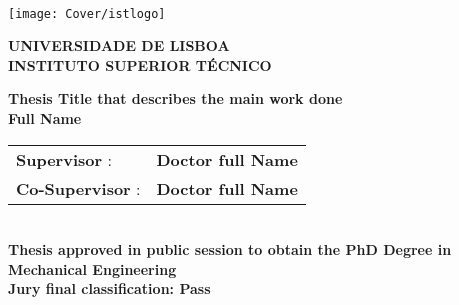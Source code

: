 \setcounter{page}{1} 


\thispagestyle{empty}
\begin{flushleft} ~\\ \vspace{-12mm} \hspace{-12mm}  \texttt{[image: Cover/istlogo]} 
 
\centering
\LARGE \textbf{UNIVERSIDADE DE LISBOA \\ INSTITUTO SUPERIOR TÉCNICO}
\vspace{10mm}

 
\centering
\Large \textbf{Thesis Title that describes the main work done}
\\ \vspace{8mm}  %
\Large\textbf{Full Name} \\
\vspace{8mm}

\Large %
\begin{minipage}{\textwidth}
\begin{tabularx}{\textwidth}{ l @{ } l }
 \textbf{Supervisor} : & \textbf{Doctor full Name}\\
 \textbf{Co-Supervisor} :  &  \textbf{Doctor full Name}\\
\end{tabularx}
\end{minipage}
\\ \vspace{8mm}
\centering
\Large \textbf{Thesis approved in public session to obtain the PhD Degree in}\\
\Large \textbf{Mechanical Engineering}\\
\vspace{5mm}
\Large \textbf{Jury final classification:  Pass}\\
 

\end{flushleft}
